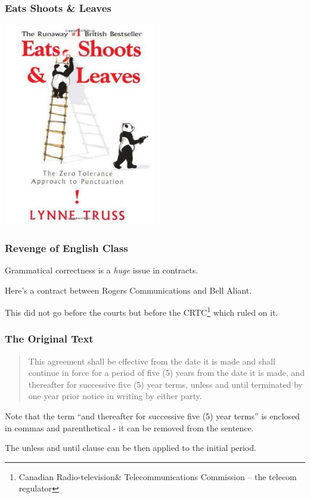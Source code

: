\begin{frame}
\frametitle{Eats Shoots \& Leaves}

\begin{center}
	\includegraphics[width=0.5\textwidth]{images/eatshootsleaves.jpg}
\end{center}

\end{frame}

\begin{frame}
\frametitle{Revenge of English Class}

Grammatical correctness is a \textit{huge} issue in contracts. 

Here's a contract between Rogers Communications and Bell Aliant.

This did not go before the courts but before the CRTC\footnote{Canadian Radio-television\& Telecommunications Commission -- the telecom regulator} which ruled on it.


\end{frame}



\begin{frame}
\frametitle{The Original Text}

\begin{quote}
This agreement shall be effective from the date it is made and shall continue in force for a period of five (5) years from the date it is made, and thereafter for successive five (5) year terms, unless and until terminated by one year prior notice in writing by either party.
\end{quote}

Note that the term ``and thereafter for successive five (5) year terms'' is enclosed in commas and parenthetical - it can be removed from the sentence.

The unless and until clause can be then applied to the initial period.

\end{frame}




